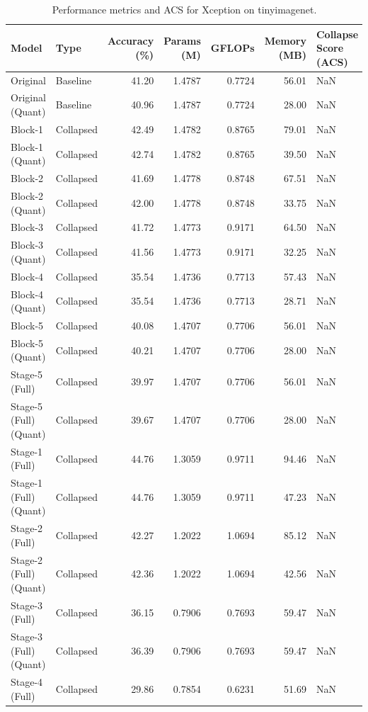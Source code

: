\begin{table}
\caption{Performance metrics and ACS for Xception on tinyimagenet.}
\label{tab:Xception_tinyimagenet}
\begin{tabular}{llrrrrl}
\toprule
Model & Type & Accuracy (\%) & Params (M) & GFLOPs & Memory (MB) & Collapse Score (ACS) \\
\midrule
Original & Baseline & 41.20 & 1.4787 & 0.7724 & 56.01 & NaN \\
Original
(Quant) & Baseline & 40.96 & 1.4787 & 0.7724 & 28.00 & NaN \\
Block-1 & Collapsed & 42.49 & 1.4782 & 0.8765 & 79.01 & NaN \\
Block-1
(Quant) & Collapsed & 42.74 & 1.4782 & 0.8765 & 39.50 & NaN \\
Block-2 & Collapsed & 41.69 & 1.4778 & 0.8748 & 67.51 & NaN \\
Block-2
(Quant) & Collapsed & 42.00 & 1.4778 & 0.8748 & 33.75 & NaN \\
Block-3 & Collapsed & 41.72 & 1.4773 & 0.9171 & 64.50 & NaN \\
Block-3
(Quant) & Collapsed & 41.56 & 1.4773 & 0.9171 & 32.25 & NaN \\
Block-4 & Collapsed & 35.54 & 1.4736 & 0.7713 & 57.43 & NaN \\
Block-4
(Quant) & Collapsed & 35.54 & 1.4736 & 0.7713 & 28.71 & NaN \\
Block-5 & Collapsed & 40.08 & 1.4707 & 0.7706 & 56.01 & NaN \\
Block-5
(Quant) & Collapsed & 40.21 & 1.4707 & 0.7706 & 28.00 & NaN \\
Stage-5 (Full) & Collapsed & 39.97 & 1.4707 & 0.7706 & 56.01 & NaN \\
Stage-5 (Full)
(Quant) & Collapsed & 39.67 & 1.4707 & 0.7706 & 28.00 & NaN \\
Stage-1 (Full) & Collapsed & 44.76 & 1.3059 & 0.9711 & 94.46 & NaN \\
Stage-1 (Full)
(Quant) & Collapsed & 44.76 & 1.3059 & 0.9711 & 47.23 & NaN \\
Stage-2 (Full) & Collapsed & 42.27 & 1.2022 & 1.0694 & 85.12 & NaN \\
Stage-2 (Full)
(Quant) & Collapsed & 42.36 & 1.2022 & 1.0694 & 42.56 & NaN \\
Stage-3 (Full) & Collapsed & 36.15 & 0.7906 & 0.7693 & 59.47 & NaN \\
Stage-3 (Full)
(Quant) & Collapsed & 36.39 & 0.7906 & 0.7693 & 59.47 & NaN \\
Stage-4 (Full) & Collapsed & 29.86 & 0.7854 & 0.6231 & 51.69 & NaN \\

\end{tabular}
\end{table}
